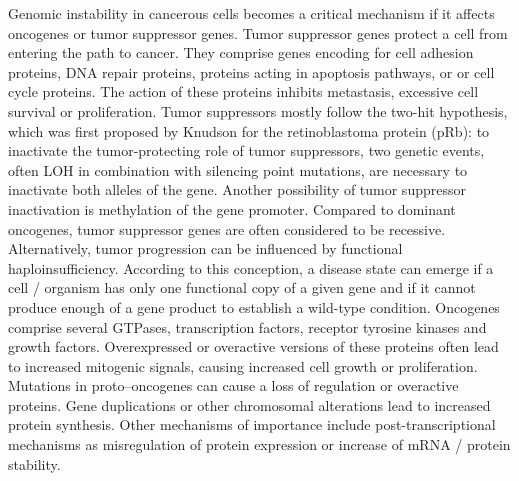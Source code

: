       Genomic instability in cancerous cells becomes a critical mechanism if it
      affects oncogenes or tumor suppressor genes. Tumor suppressor genes protect
      a cell from entering the path to cancer. They comprise
      genes encoding for cell adhesion proteins,  DNA repair proteins, proteins
      acting in apoptosis pathways, or or cell cycle proteins. The action of these
      proteins inhibits metastasis, excessive cell survival or proliferation. Tumor
      suppressors mostly follow the two-hit hypothesis, which was first proposed
      by Knudson  for the retinoblastoma protein (pRb): to inactivate the
      tumor-protecting role of tumor suppressors, two genetic events,
      often LOH in  combination with silencing point mutations, are necessary to
      inactivate both alleles of the gene. Another possibility of tumor
      suppressor inactivation is methylation of the gene promoter. Compared to
      dominant oncogenes, tumor suppressor genes are often considered to be
      recessive. Alternatively, tumor progression can be influenced by functional
      haploinsufficiency. According to this conception, a disease state can emerge
      if a cell / organism has only one functional  copy of a given gene and if it
      cannot  produce enough of a gene product to establish a wild-type condition.
      Oncogenes comprise several GTPases, transcription factors, receptor tyrosine
      kinases and growth factors. Overexpressed or overactive versions of these
      proteins often lead to increased mitogenic signals, causing increased
      cell growth or proliferation. Mutations in proto--oncogenes can cause a
      loss of regulation or overactive proteins. Gene duplications or other
      chromosomal alterations lead to increased protein synthesis. Other
      mechanisms of importance include post-transcriptional mechanisms as
      misregulation of protein expression or increase of mRNA / protein stability.

